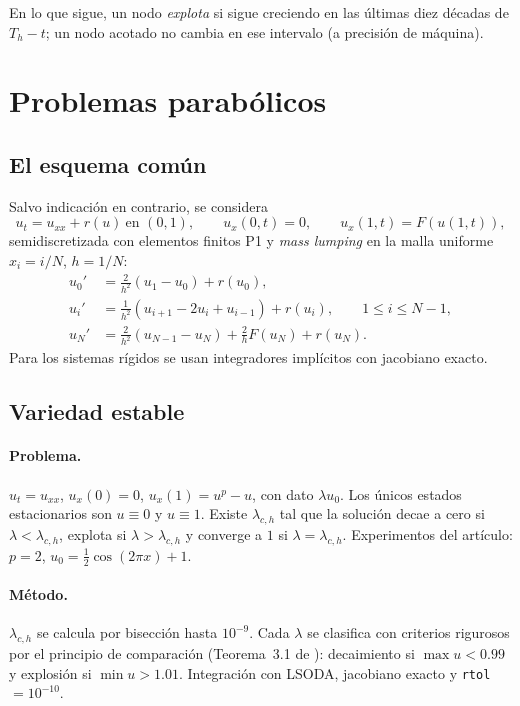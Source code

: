 \documentclass[11pt,a4paper]{article}
\newcommand{\code}[1]{\texttt{#1}}
\begin{document}
En lo que sigue, un nodo \emph{explota} si sigue creciendo en las últimas
diez décadas de $T_h-t$; un nodo acotado no cambia en ese intervalo (a
precisión de máquina).

\section{Problemas parabólicos}\label{sec:parab}

\subsection{El esquema común}

Salvo indicación en contrario, se considera
\[
u_t=u_{xx}+r(u)\ \text{en }(0,1),\qquad u_x(0,t)=0,\qquad u_x(1,t)=F(u(1,t)),
\]
semidiscretizada con elementos finitos P1 y \emph{mass lumping} en la malla
uniforme $x_i=i/N$, $h=1/N$:
\begin{align*}
u_0'&=\tfrac{2}{h^2}(u_1-u_0)+r(u_0),\\
u_i'&=\tfrac{1}{h^2}(u_{i+1}-2u_i+u_{i-1})+r(u_i),\qquad 1\le i\le N-1,\\
u_N'&=\tfrac{2}{h^2}(u_{N-1}-u_N)+\tfrac{2}{h}F(u_N)+r(u_N).
\end{align*}
Para los sistemas rígidos se usan integradores implícitos con jacobiano
exacto.

\subsection{Variedad estable \cite{AFR}}

\paragraph{Problema.} $u_t=u_{xx}$, $u_x(0)=0$, $u_x(1)=u^p-u$, con dato
$\lambda u_0$. Los únicos estados estacionarios son $u\equiv0$ y $u\equiv1$.
Existe $\lambda_{c,h}$ tal que la solución decae a cero si
$\lambda<\lambda_{c,h}$, explota si $\lambda>\lambda_{c,h}$ y converge a
$1$ si $\lambda=\lambda_{c,h}$. Experimentos del artículo: $p=2$,
$u_0=\frac12\cos(2\pi x)+1$.

\paragraph{Método.} $\lambda_{c,h}$ se calcula por bisección hasta
$10^{-9}$. Cada $\lambda$ se clasifica con criterios rigurosos por el
principio de comparación (Teorema~3.1 de \cite{AFR}): decaimiento si
$\max u<0.99$ y explosión si $\min u>1.01$. Integración con LSODA, jacobiano
exacto y \code{rtol}$=10^{-10}$.
\end{document}
